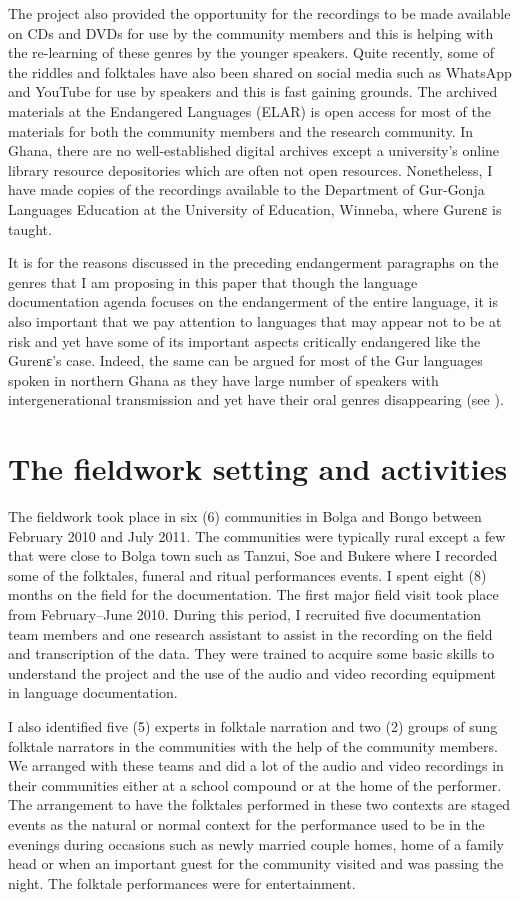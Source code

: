 \documentclass[output=paper,colorlinks,citecolor=brown]{langscibook}
\begin{document}
The project also provided the opportunity for the recordings to be made available on CDs and DVDs for use by the community members and this is helping with the re-learning of these genres by the younger speakers. Quite recently, some of the riddles and folktales have also been shared on social media such as WhatsApp and YouTube for use by speakers and this is fast gaining grounds. The archived materials at the Endangered Languages (ELAR) is open access for most of the materials for both the community members and the research community. In Ghana, there are no well-established digital archives except a university’s online library resource depositories which are often not open resources. Nonetheless, I have made copies of the recordings available to the Department of Gur-Gonja Languages Education at the University of Education, Winneba, where Gurenɛ is taught.

It is for the reasons discussed in the preceding endangerment paragraphs on the genres that  
I am proposing in this paper that though the language documentation agenda focuses on the endangerment of the entire language, it is also important that we pay attention to languages that may appear not to be at risk and yet have some of its important aspects critically endangered like the Gurenɛ’s case. Indeed, the same can be argued for most of the Gur languages spoken in northern Ghana as they have large number of speakers with intergenerational transmission and yet have their oral genres disappearing (see \citealt{Bodomo2004, Bodomo2020}).

\section{The fieldwork setting and activities}
The fieldwork took place in six (6) communities in Bolga and Bongo between February 2010 and July 2011. The communities were typically rural except a few that were close to Bolga town such as Tanzui, Soe and Bukere where I recorded some of the folktales, funeral and ritual performances events. I spent eight (8) months on the field for the documentation. The first major field visit took place from February–June 2010. During this period, I recruited five documentation team members and one research assistant to assist in the recording on the field and transcription of the data. They were trained to acquire some basic skills to understand the project and the use of the audio and video recording equipment in language documentation. 

I also identified five (5) experts in folktale narration and two (2) groups of sung folktale narrators in the communities with the help of the community members. We arranged with these teams and did a lot of the audio and video recordings in their communities either at a school compound or at the home of the performer. The arrangement to have the folktales performed in these two contexts are staged events as the natural or normal context for the performance used to be in the evenings during occasions such as newly married couple homes, home of a family head or when an important guest for the community visited and was passing the night. The folktale performances were for entertainment.  
\end{document}
